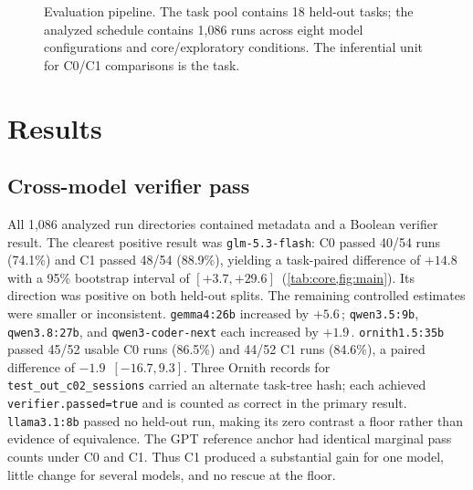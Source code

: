 \documentclass[10pt]{article}
\newcommand{\pp}{\,\text{pp}}
\newcommand{\QwenWeak}{\texttt{qwen3.5:\allowbreak 9b}}
\newcommand{\Gemma}{\texttt{gemma4:\allowbreak 26b}}
\newcommand{\QwenStrong}{\texttt{qwen3.8:\allowbreak 27b}}
\newcommand{\Coder}{\texttt{qwen3-coder-next}}
\newcommand{\Llama}{\texttt{llama3.1:\allowbreak 8b}}
\newcommand{\Ornith}{\texttt{ornith1.5:\allowbreak 35b}}
\newcommand{\GLM}{\texttt{glm-5.3-flash}}
\begin{document}
\begin{figure}[t]
\centering
{}
\caption{Evaluation pipeline. The task pool contains 18 held-out tasks; the analyzed schedule contains 1,086 runs across eight model configurations and core/exploratory conditions. The inferential unit for C0/C1 comparisons is the task.}
\label{fig:pipeline}
\end{figure}

\section{Results}
\subsection{Cross-model verifier pass}
All 1,086 analyzed run directories contained metadata and a Boolean verifier result. The clearest positive result was \GLM{}: C0 passed 40/54 runs (74.1\%) and C1 passed 48/54 (88.9\%), yielding a task-paired difference of \(+14.8\)\pp{} with a 95\% bootstrap interval of \([+3.7,+29.6]\)\pp{} (\cref{tab:core,fig:main}). Its direction was positive on both held-out splits. The remaining controlled estimates were smaller or inconsistent. \Gemma{} increased by \(+5.6\)\pp{}; \QwenWeak{}, \QwenStrong{}, and \Coder{} each increased by \(+1.9\)\pp{}. \Ornith{} passed 45/52 usable C0 runs (86.5\%) and 44/52 C1 runs (84.6\%), a paired difference of \(-1.9\)\pp{} \([-16.7,9.3]\). Three Ornith records for \texttt{test\_out\_c02\_sessions} carried an alternate task-tree hash; each achieved \texttt{verifier.passed=true} and is counted as correct in the primary result. \Llama{} passed no held-out run, making its zero contrast a floor rather than evidence of equivalence. The GPT reference anchor had identical marginal pass counts under C0 and C1. Thus C1 produced a substantial gain for one model, little change for several models, and no rescue at the floor.
\end{document}
